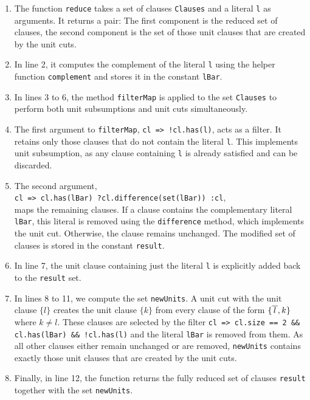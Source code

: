 \begin{enumerate}
\item The function \texttt{reduce} takes a set of clauses \texttt{Clauses} and a literal \texttt{l} as arguments.
  It returns a pair: The first component is the reduced set of clauses, the second component is the set of
  those unit clauses that are created by the unit cuts.
\item In line 2, it computes the complement of the literal \texttt{l} using the helper function
  \texttt{complement} and stores it in the constant \texttt{lBar}. 
\item In lines 3 to 6, the method \texttt{filterMap} is applied to the set \texttt{Clauses} to perform both
  unit subsumptions and unit cuts simultaneously. 
\item The first argument to \texttt{filterMap}, \texttt{cl => !cl.has(l)}, acts as a filter. It retains only
  those clauses that do not contain the literal \texttt{l}. This implements unit subsumption, as any clause
  containing \texttt{l} is already satisfied and can be discarded. 
\item The second argument, 
  \\[0.2cm]
  \hspace*{1.3cm}
  \texttt{cl => cl.has(lBar) ?\;cl.difference(set(lBar)) :\;cl}, 
  \\[0.2cm]
  maps the remaining clauses. If a clause contains the complementary literal \texttt{lBar}, this literal is
  removed using the \texttt{difference} method, which implements the unit cut. Otherwise, the clause remains
  unchanged. The modified set of clauses is stored in the constant \texttt{result}. 
\item In line 7, the unit clause containing just the literal \texttt{l} is explicitly added back to the
  \texttt{result} set.
\item In lines 8 to 11, we compute the set \texttt{newUnits}.  A unit cut with the unit clause $\{l\}$ creates
  the unit clause $\{k\}$ from every clause of the form $\{\overline{\,l\,}, k\}$ where $k \not= l$.  These clauses
  are selected by the filter \texttt{cl => cl.size == 2 \&\& cl.has(lBar) \&\& !cl.has(l)} and the literal
  \texttt{lBar} is removed from them.  As all other clauses either remain unchanged or are removed,
  \texttt{newUnits} contains exactly those unit clauses that are created by the unit cuts.
\item Finally, in line 12, the function returns the fully reduced set of clauses \texttt{result} together with
  the set \texttt{newUnits}.
\end{enumerate}




